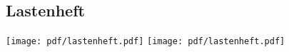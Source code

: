 \subsection{Lastenheft}
\texttt{[image: pdf/lastenheft.pdf]}
\newpage
\texttt{[image: pdf/lastenheft.pdf]}
\newpage